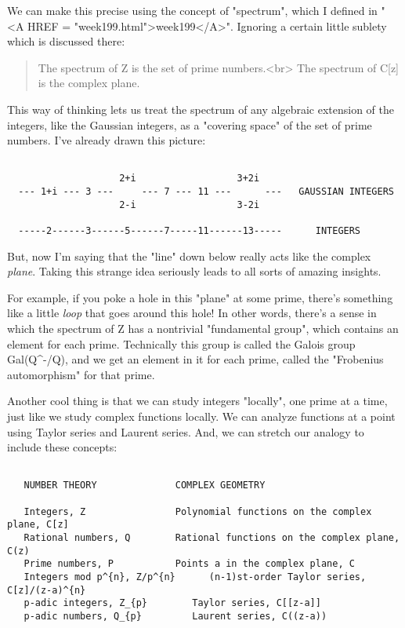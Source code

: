 We can make this precise using the concept of "spectrum",
which I defined in "<A HREF = "week199.html">week199</A>".
Ignoring a certain little sublety which is discussed there:

\begin{quote}
   The spectrum of Z is the set of prime numbers.<br>
   The spectrum of C[z] is the complex plane.
\end{quote}

This way of thinking lets us treat the spectrum of any algebraic
extension of the integers, like the Gaussian integers, as a
"covering space" of the set of prime numbers.  I've already
drawn this picture:



\begin{verbatim}

                    2+i                  3+2i
  --- 1+i --- 3 ---     --- 7 --- 11 ---      ---   GAUSSIAN INTEGERS 
                    2-i                  3-2i           

  -----2------3------5------7-----11------13-----      INTEGERS

\end{verbatim}
    

But, now I'm saying that the "line" down below really acts
like the complex \emph{plane}.  Taking this strange idea seriously leads to
all sorts of amazing insights.

For example, if you poke a hole in this "plane" at some
prime, there's something like a little \emph{loop} that goes around this
hole!  In other words, there's a sense in which the spectrum of Z has
a nontrivial "fundamental group", which contains an element
for each prime.  Technically this group is called the Galois group
Gal(Q^{-}/Q), and we get an element in it for each prime, called the
"Frobenius automorphism" for that prime.

Another cool thing is that we can study integers "locally", one prime at a 
time, just like we study complex functions locally.  We can analyze functions
at a point using Taylor series and Laurent series.   And, we can stretch our 
analogy to include these concepts:


\begin{verbatim}

   NUMBER THEORY              COMPLEX GEOMETRY     

   Integers, Z                Polynomial functions on the complex plane, C[z]
   Rational numbers, Q        Rational functions on the complex plane, C(z)
   Prime numbers, P           Points a in the complex plane, C    
   Integers mod p^{n}, Z/p^{n}      (n-1)st-order Taylor series, C[z]/(z-a)^{n}
   p-adic integers, Z_{p}        Taylor series, C[[z-a]]
   p-adic numbers, Q_{p}         Laurent series, C((z-a))
\end{verbatim}
    

